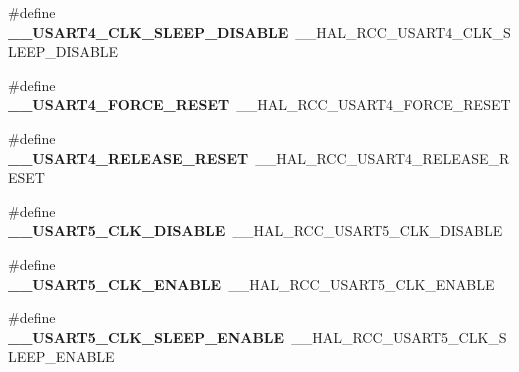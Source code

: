 \begin{DoxyCompactItemize}
\item 
\#define {\bfseries \+\_\+\+\_\+\+U\+S\+A\+R\+T4\+\_\+\+C\+L\+K\+\_\+\+S\+L\+E\+E\+P\+\_\+\+D\+I\+S\+A\+B\+LE}~\+\_\+\+\_\+\+H\+A\+L\+\_\+\+R\+C\+C\+\_\+\+U\+S\+A\+R\+T4\+\_\+\+C\+L\+K\+\_\+\+S\+L\+E\+E\+P\+\_\+\+D\+I\+S\+A\+B\+LE\hypertarget{group___h_a_l___r_c_c___aliased_ga521d2e55e5207d611debbe98b2a7a22e}{}\label{group___h_a_l___r_c_c___aliased_ga521d2e55e5207d611debbe98b2a7a22e}

\item 
\#define {\bfseries \+\_\+\+\_\+\+U\+S\+A\+R\+T4\+\_\+\+F\+O\+R\+C\+E\+\_\+\+R\+E\+S\+ET}~\+\_\+\+\_\+\+H\+A\+L\+\_\+\+R\+C\+C\+\_\+\+U\+S\+A\+R\+T4\+\_\+\+F\+O\+R\+C\+E\+\_\+\+R\+E\+S\+ET\hypertarget{group___h_a_l___r_c_c___aliased_ga342c60e019e63a7d8e932557a6dfc35a}{}\label{group___h_a_l___r_c_c___aliased_ga342c60e019e63a7d8e932557a6dfc35a}

\item 
\#define {\bfseries \+\_\+\+\_\+\+U\+S\+A\+R\+T4\+\_\+\+R\+E\+L\+E\+A\+S\+E\+\_\+\+R\+E\+S\+ET}~\+\_\+\+\_\+\+H\+A\+L\+\_\+\+R\+C\+C\+\_\+\+U\+S\+A\+R\+T4\+\_\+\+R\+E\+L\+E\+A\+S\+E\+\_\+\+R\+E\+S\+ET\hypertarget{group___h_a_l___r_c_c___aliased_ga3381ddee2f7d2103d68173317808e96e}{}\label{group___h_a_l___r_c_c___aliased_ga3381ddee2f7d2103d68173317808e96e}

\item 
\#define {\bfseries \+\_\+\+\_\+\+U\+S\+A\+R\+T5\+\_\+\+C\+L\+K\+\_\+\+D\+I\+S\+A\+B\+LE}~\+\_\+\+\_\+\+H\+A\+L\+\_\+\+R\+C\+C\+\_\+\+U\+S\+A\+R\+T5\+\_\+\+C\+L\+K\+\_\+\+D\+I\+S\+A\+B\+LE\hypertarget{group___h_a_l___r_c_c___aliased_gadca81993c4e9a134d292ee509f2108da}{}\label{group___h_a_l___r_c_c___aliased_gadca81993c4e9a134d292ee509f2108da}

\item 
\#define {\bfseries \+\_\+\+\_\+\+U\+S\+A\+R\+T5\+\_\+\+C\+L\+K\+\_\+\+E\+N\+A\+B\+LE}~\+\_\+\+\_\+\+H\+A\+L\+\_\+\+R\+C\+C\+\_\+\+U\+S\+A\+R\+T5\+\_\+\+C\+L\+K\+\_\+\+E\+N\+A\+B\+LE\hypertarget{group___h_a_l___r_c_c___aliased_gad959221f7e570f55a18bc2bf2e849b06}{}\label{group___h_a_l___r_c_c___aliased_gad959221f7e570f55a18bc2bf2e849b06}

\item 
\#define {\bfseries \+\_\+\+\_\+\+U\+S\+A\+R\+T5\+\_\+\+C\+L\+K\+\_\+\+S\+L\+E\+E\+P\+\_\+\+E\+N\+A\+B\+LE}~\+\_\+\+\_\+\+H\+A\+L\+\_\+\+R\+C\+C\+\_\+\+U\+S\+A\+R\+T5\+\_\+\+C\+L\+K\+\_\+\+S\+L\+E\+E\+P\+\_\+\+E\+N\+A\+B\+LE\hypertarget{group___h_a_l___r_c_c___aliased_gab2e735cf263fe2d66068649c893f9421}{}\label{group___h_a_l___r_c_c___aliased_gab2e735cf263fe2d66068649c893f9421}


\end{DoxyCompactItemize}
